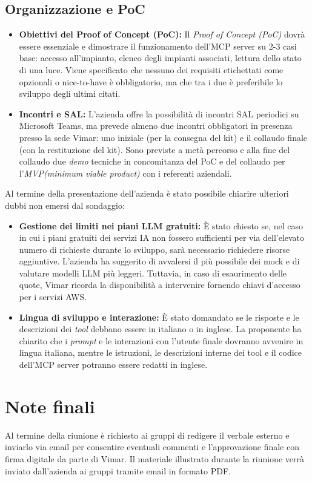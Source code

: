 \documentclass[11pt, a4paper]{article}
\begin{document}
\subsection{ Organizzazione e PoC}
\begin{itemize}
    \item \textbf{Obiettivi del Proof of Concept (PoC):} Il \textit{Proof of Concept (PoC)} dovrà essere essenziale e dimostrare il funzionamento dell'MCP server su 2-3 casi base: accesso all'impianto, elenco degli impianti associati, lettura dello stato di una luce.
    Viene specificato che nessuno dei requisiti etichettati come opzionali o nice-to-have è obbligatorio, ma che tra i due è preferibile lo sviluppo degli ultimi citati.
    
    \item \textbf{Incontri e SAL:} L'azienda offre la possibilità di incontri SAL periodici su Microsoft Teams, ma prevede almeno due incontri obbligatori in presenza presso la sede Vimar: uno iniziale (per la consegna del kit) e il collaudo finale (con la restituzione del kit). Sono previste a metà percorso e alla fine del collaudo due \textit{demo} tecniche in concomitanza del PoC e del collaudo per l'\textit{MVP(minimum viable product)} con i referenti aziendali.
    
\end{itemize}
\noindent
Al termine della presentazione dell'azienda è stato possibile chiarire ulteriori dubbi non emersi dal sondaggio:

\begin{itemize}
    \item \textbf{Gestione dei limiti nei piani LLM gratuiti:} È stato chiesto se, nel caso in cui i piani gratuiti dei servizi IA non fossero sufficienti per via dell'elevato numero di richieste durante lo sviluppo, sarà necessario richiedere risorse aggiuntive. L'azienda ha suggerito di avvalersi il più possibile dei mock e di valutare modelli LLM più leggeri. Tuttavia, in caso di esaurimento delle quote, Vimar ricorda la disponibilità a intervenire fornendo chiavi d'accesso per i servizi AWS.
    
    \item \textbf{Lingua di sviluppo e interazione:} È stato domandato se le risposte e le descrizioni dei \textit{tool} debbano essere in italiano o in inglese. La proponente ha chiarito che i \textit{prompt} e le interazioni con l'utente finale dovranno avvenire in lingua italiana, mentre le istruzioni, le descrizioni interne dei tool e il codice dell'MCP server potranno essere redatti in inglese.
\end{itemize}

\section{Note finali}
Al termine della riunione è richiesto ai gruppi di redigere il verbale esterno e inviarlo via email per consentire eventuali commenti e l'approvazione finale con firma digitale da parte di Vimar. Il materiale illustrato durante la riunione verrà inviato dall'azienda ai gruppi tramite email in formato PDF.
\vfill
\end{document}
